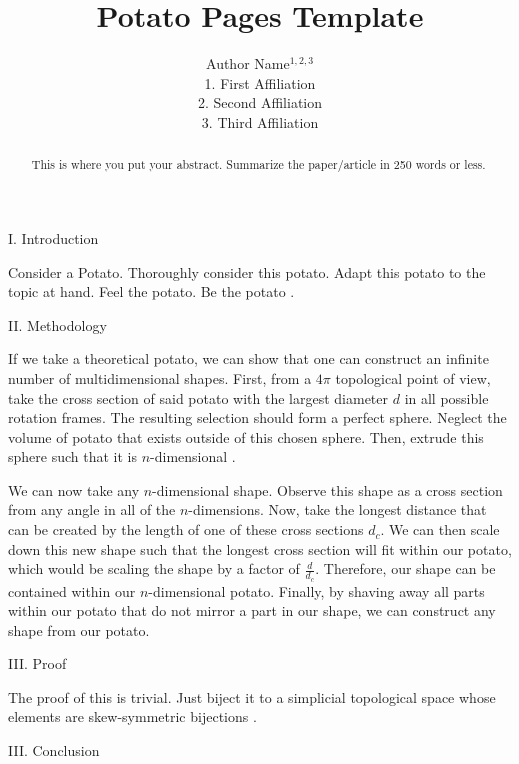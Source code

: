 \documentclass[11pt]{article}
\title{Potato Pages Template}
\author{Author Name$^{1,2,3}$\\ \scriptsize{1. First Affiliation} \\ \scriptsize{2. Second Affiliation} \\ \scriptsize{3. Third Affiliation}}
\date{}
\begin{document}
\maketitle
\thispagestyle{fancy}

\begin{abstract}
	This is where you put your abstract. Summarize the paper/article in 250 words or less.
\end{abstract}

\begin{multicols}{2}
	
\begin{center}
	I. Introduction
\end{center}

Consider a Potato. Thoroughly consider this potato. Adapt this potato to the topic at hand. Feel the potato. Be the potato \cite{scroll}.

\begin{center}
	II. Methodology
\end{center}

If we take a theoretical potato, we can show that one can construct an infinite number of multidimensional shapes. First, from a $4\pi$ topological point of view, take the cross section of said potato with the largest diameter $d$ in all possible rotation frames. The resulting selection should form a perfect sphere. Neglect the volume of potato that exists outside of this chosen sphere. Then, extrude this sphere such that it is $n$-dimensional \cite{n}.

We can now take any $n$-dimensional shape. Observe this shape as a cross section from any angle in all of the $n$-dimensions. Now, take the longest distance that can be created by the length of one of these cross sections $d_c$. We can then scale down this new shape such that the longest cross section will fit within our potato, which would be scaling the shape by a factor of $\frac{d}{d_c}$. Therefore, our shape can be contained within our $n$-dimensional potato. Finally, by shaving away all parts within our potato that do not mirror a part in our shape, we can construct any shape from our potato.

\begin{center}
	III. Proof
\end{center}

The proof of this is trivial. Just biject it to a simplicial topological space whose elements are skew-symmetric bijections \cite{proof}.

\begin{center}
	III. Conclusion
\end{center}


\end{multicols}
\end{document}

